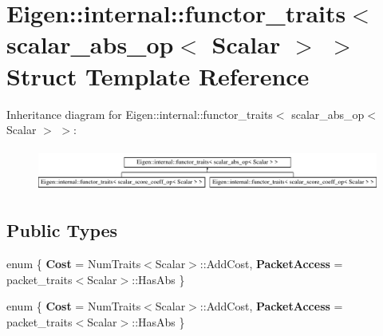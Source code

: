 \hypertarget{struct_eigen_1_1internal_1_1functor__traits_3_01scalar__abs__op_3_01_scalar_01_4_01_4}{}\section{Eigen\+:\+:internal\+:\+:functor\+\_\+traits$<$ scalar\+\_\+abs\+\_\+op$<$ Scalar $>$ $>$ Struct Template Reference}
\label{struct_eigen_1_1internal_1_1functor__traits_3_01scalar__abs__op_3_01_scalar_01_4_01_4}
Inheritance diagram for Eigen\+:\+:internal\+:\+:functor\+\_\+traits$<$ scalar\+\_\+abs\+\_\+op$<$ Scalar $>$ $>$\+:\begin{figure}[H]
\begin{center}
\leavevmode
\includegraphics[height=1.414141cm]{struct_eigen_1_1internal_1_1functor__traits_3_01scalar__abs__op_3_01_scalar_01_4_01_4}
\end{center}
\end{figure}
\subsection*{Public Types}
\begin{DoxyCompactItemize}
\item 
\mbox{\label{struct_eigen_1_1internal_1_1functor__traits_3_01scalar__abs__op_3_01_scalar_01_4_01_4_a24ecb9bbad96e47c77171cd38ca438e6}} 
enum \{ {\bfseries Cost} = Num\+Traits$<$Scalar$>$\+:\+:Add\+Cost, 
{\bfseries Packet\+Access} = packet\+\_\+traits$<$Scalar$>$\+:\+:Has\+Abs
 \}
\item 
\mbox{\label{struct_eigen_1_1internal_1_1functor__traits_3_01scalar__abs__op_3_01_scalar_01_4_01_4_abe508798e02cab242e75a7ae3f60a3ae}} 
enum \{ {\bfseries Cost} = Num\+Traits$<$Scalar$>$\+:\+:Add\+Cost, 
{\bfseries Packet\+Access} = packet\+\_\+traits$<$Scalar$>$\+:\+:Has\+Abs
 \}
\end{DoxyCompactItemize}


